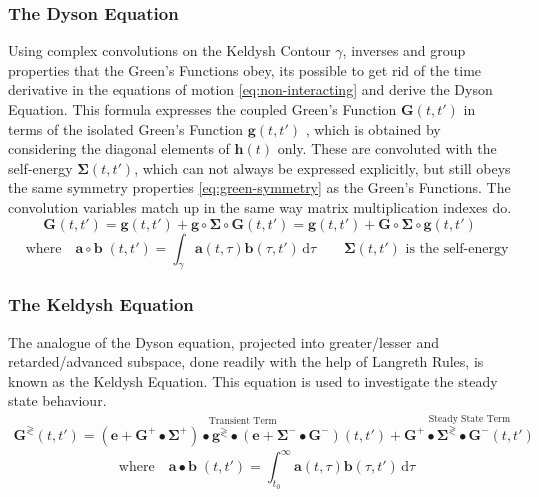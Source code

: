 \documentclass{article}[12pt]
\numberwithin{equation}{section}
\begin{document}
\subsubsection{The Dyson Equation}\vspace{-10pt}
Using complex convolutions on the Keldysh Contour $\gamma$, inverses and
group properties that the Green's Functions obey, its possible to get rid of the time derivative in the equations of motion \eqref{eq:non-interacting} and derive the Dyson Equation.
This formula expresses the coupled Green's Function $\mathbf{G}(t,t')$ in terms of the isolated Green's Function $\mathbf{g}(t,t')$  , which is obtained by considering the diagonal elements of $\mathbf{h}(t)$ only.
These are convoluted with the self-energy $\mathbf\Sigma(t,t')$, which can not always be expressed explicitly, but still obeys the same symmetry properties \eqref{eq:green-symmetry} as the Green's Functions. The convolution variables match up in the same way matrix multiplication
indexes do.\vspace{-10pt}
\begin{equation}\label{eq:dyson}
\mathbf{G}_{}(t,t')=
\mathbf{g}(t,t')+\mathbf{g}\circ
\mathbf{\Sigma}\circ\mathbf{G}(t,t')=
\mathbf{g}(t,t')+\mathbf{G}\circ
\mathbf{\Sigma}\circ\mathbf{g}(t,t')
\end{equation}
\begin{equation*}
\quad\text{where}\quad
\mathbf a\circ\mathbf b\;(t,t')=
\int_\gamma\!\mathbf a(t,\tau)\mathbf b(\tau,t')\,\mathrm{d}\tau
\qquad
\mathbf{\Sigma}(t,t')
\text{ is the self-energy}
\end{equation*}
\subsubsection{The Keldysh Equation}\vspace{-10pt}
The analogue of the Dyson equation, projected into  greater/lesser
and retarded/advanced  subspace, done readily with the help of Langreth Rules, is known as the Keldysh Equation.
This equation is used to investigate the steady state behaviour.
\vspace{6pt}
\begin{align}\label{eq:keldysh}
\mathbf{G}^{\gtrless}(t,t')=
\overset{\text{Transient Term}}
{\left(
\mathbf{e}+\mathbf{G}^{+}\bullet\mathbf{\Sigma}^{+}
\right)
\bullet\mathbf{g}^{\gtrless}\bullet
\left(
\mathbf{e}+\mathbf{\Sigma}^{-}\bullet\mathbf{G}^{-}
\right)(t,t')}+
\overset{\text{Steady State Term}}
{\mathbf{G}^{+}
\bullet\mathbf{\Sigma}^{\gtrless}\bullet
\mathbf{G}^{-}(t,t')}
\end{align}
\vspace{-22pt}
\begin{equation*}
\quad\text{where}\quad
\mathbf a\bullet\mathbf b\;(t,t')=
\int_{t_0}^{\infty}\!\mathbf{a}(t,\tau)\mathbf{b}(\tau,t')\,\mathrm{d}\tau
\end{equation*}
\end{document}
